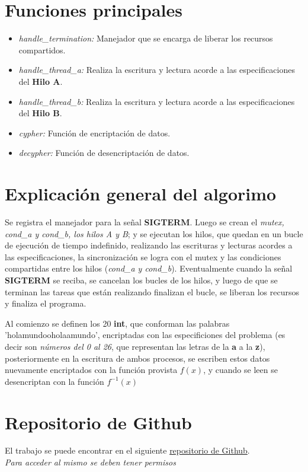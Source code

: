 \documentclass[letterpaper, 10 pt, conference]{ieeeconf}  %
\begin{document}
\section{Funciones principales}
\begin{itemize}
  \item \textit{handle\_termination:} Manejador que se encarga de liberar los recursos compartidos.
  \item \textit{handle\_thread\_a:} Realiza la escritura y lectura acorde a las especificaciones del \textbf{Hilo A}.
  \item \textit{handle\_thread\_b:} Realiza la escritura y lectura acorde a las especificaciones del \textbf{Hilo B}.
  \item \textit{cypher:} Función de encriptación de datos.
  \item \textit{decypher:} Función de desencriptación de datos.
\end{itemize}

\section{Explicación general del algorimo}
Se registra el manejador para la señal \textbf{SIGTERM}. Luego se crean el \textit{mutex, cond\_a y cond\_b, los hilos A y B}; y se ejecutan los hilos, que quedan en un bucle de ejecución de tiempo indefinido, realizando las escrituras y lecturas acordes a las especificaciones, la sincronización se logra con el mutex y las condiciones compartidas entre los hilos (\textit{cond\_a y cond\_b}). Eventualmente cuando la señal \textbf{SIGTERM} se reciba, se cancelan los bucles de los hilos, y luego de que se terminan las tareas que están realizando finalizan el bucle, se liberan los recursos y finaliza el programa.

Al comienzo se definen los 20 \textbf{int}, que conforman las palabras 'holamundooholaamundo', encriptadas con las especificiones del problema (es decir son \textit{números del 0 al 26}, que representan las letras de la \textbf{a} a la \textbf{z}), posteriormente en la escritura de ambos procesos, se escriben estos datos nuevamente encriptados con la función provista $f(x)$, y cuando se leen se desencriptan con la función $f^{-1}(x)$

\section{Repositorio de Github}
El trabajo se puede encontrar en el siguiente \href{https://github.com/SOyR-2024-Grupo-10/Entregable-practica-3}{repositorio de Github}. \\ 
\textit{Para acceder al mismo se deben tener permisos}
\end{document}
